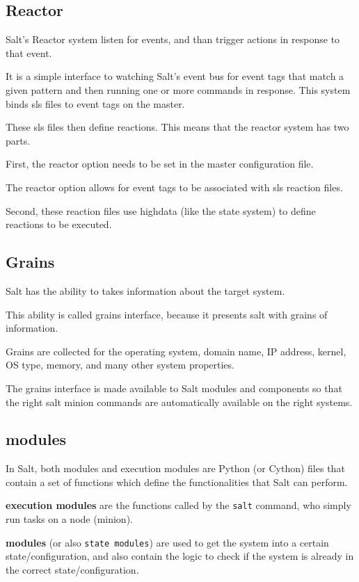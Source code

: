 \documentclass[12pt,a4paper,openright,twoside]{book}
\begin{document}
\subsection{Reactor}
Salt's Reactor system listen for events, and than trigger actions in response to that event.

It is a simple interface to watching Salt's event bus for event tags that match a given pattern and then running one or more commands in response.
This system binds sls files to event tags on the master.


These sls files then define reactions. This means that the reactor system has two parts.


First, the reactor option needs to be set in the master configuration file.


The reactor option allows for event tags to be associated with sls reaction files.


Second, these reaction files use highdata (like the state system) to define reactions to be executed.\cite{saltDocReactor}

\subsection{Grains}
Salt has the ability to takes information about the target system.


This ability is called grains interface, because it presents salt with grains of information.


Grains are collected for the operating system, domain name, IP address, kernel, OS type, memory, and many other system properties.


The grains interface is made available to Salt modules and components so that the right salt minion commands are automatically available on the right systems.\cite{saltDocGrains}


\subsection{modules}
In Salt, both modules and execution modules are Python (or Cython) files that contain a set of functions which define the functionalities that Salt can perform.

\textbf{execution modules} are the functions called by the \texttt{salt} command, who simply run tasks on a node (minion).


\textbf{modules} (or also \texttt{state modules}) are used to get the system into a certain state/configuration, and also contain the logic to check if the system is already in the correct state/configuration.
\end{document}
